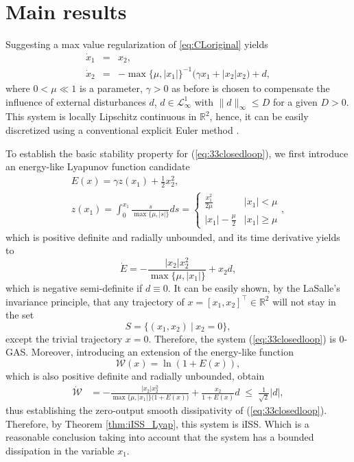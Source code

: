 \documentclass[letterpaper, 10 pt, conference]{ieeeconf}  %
\begin{document}
\section{Main results}
\label{sec:33}

Suggesting a max value regularization of \eqref{eq:CLoriginal} yields
\begin{eqnarray}
\dot{x}_{1} & = & x_{2},\label{eq:33closedloop}\\
\dot{x}_{2} & = & -\max\bigl\{\mu,\bigl|x_{1}\bigr|\bigr\}^{-1}\bigl(\gamma x_{1}+\bigl|x_{2}\bigr|x_{2}\bigr)+d,\nonumber 
\end{eqnarray}
where $0<\mu\ll1$ is a parameter, $\gamma>0$ as before is chosen
to compensate the influence of external disturbances $d$, $d\in\mathcal{L}_{\infty}^{1}$
with $\|d\|_{\infty}\leq D$ for a given $D>0$. This system is locally Lipschitz continuous in
$\mathbb{R}^{2}$, hence, it can be easily discretized using a conventional explicit Euler method \cite{Butcher2008}.

To establish the basic stability property for (\ref{eq:33closedloop}),
we first introduce an energy-like Lyapunov function candidate 
\begin{gather*}
E(x)=\gamma z(x_{1})+\frac{1}{2}x_{2}^{2},\\
z(x_{1})=\int_{0}^{x_{1}}\frac{s}{\max\{\mu,|s|\}}ds=\begin{cases}
\frac{x_{1}^{2}}{2\mu} & |x_{1}|<\mu\\
|x_{1}|-\frac{\mu}{2} & |x_{1}|\geq\mu
\end{cases},
\end{gather*}
which is positive definite and radially unbounded, and its time derivative
yields to 
\[
\dot{E}=-\frac{|x_{2}|x_{2}^{2}}{\max\{\mu,\bigl|x_{1}\bigr|\}}+x_{2}d,
\]
which is negative semi-definite if $d\equiv0$. It can be easily shown,
by the LaSalle's invariance principle, that any trajectory of  $x=[x_{1},x_{2}]^{\top}\in\mathbb{R}^{2}$ will not stay in the set 
\[
S=\bigl\{(x_{1},x_{2})\:\bigl|\:x_{2}=0\bigr\},
\]
except the trivial trajectory $x=0$. Therefore, the system (\ref{eq:33closedloop})
is $0$-GAS. Moreover, introducing an extension of the energy-like
function
\[
\mathcal{W}(x)=\ln(1+E(x)),
\]
which is also positive definite and radially unbounded, obtain
\begin{align*}
\dot{\mathcal{W}} & =-\frac{|x_{2}|x_{2}^{2}}{\max\{\mu,\bigl|x_{1}\bigr|\}\bigl(1+E(x)\bigr)}+\frac{x_{2}}{1+E(x)}d  \; \leq \; \frac{1}{\sqrt{2}}|d|,
\end{align*}
thus establishing the zero-output smooth dissipativity of (\ref{eq:33closedloop}).
Therefore, by Theorem \ref{thm:iISS_Lyap}, this system is iISS. Which
is a reasonable conclusion taking into account that the system has
a bounded dissipation in the variable $x_{1}$.
\end{document}
